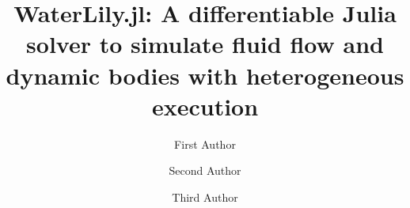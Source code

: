 \documentclass[final,3p,times]{elsarticle}
\begin{document}
\begin{frontmatter}



\title{WaterLily.jl: A differentiable Julia solver to simulate fluid flow and dynamic bodies with heterogeneous execution}


\author[a]{First Author}
\author[a,b]{Second Author}
\author[b]{Third Author}

\address[a]{First Address}
\address[b]{Second Address}




\end{frontmatter}
\end{document}
